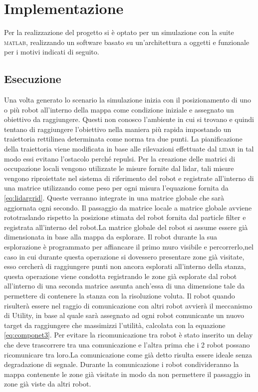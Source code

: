 \section{Implementazione}
\label{sec:implementazione}
Per la realizzazione del progetto si è optato per un simulazione con la suite
\textsc{matlab}, realizzando un software basato su un'architettura a oggetti
e funzionale per i motivi indicati di seguito.
\subsection{Esecuzione}
Una volta generato lo scenario la simulazione inizia con il posizionamento di
uno o più robot all'interno della mappa come condizione iniziale e assegnato un
obiettivo da raggiungere.
Questi non conosco l'ambiente in cui si trovano e quindi tentano di raggiungere
l'obiettivo nella maniera più rapida impostando un traiettoria rettilinea
determinata come norma tra due punti.
La pianificazione della traiettoria viene modificata in base alle rilevazioni
effettuate dal \textsc{lidar} in tal modo essi evitano l'ostacolo perché repulsi.
Per la creazione delle matrici di occupazione locali vengono utilizzate le misure
fornite dal lidar, tali misure vengono riproiettate nel sistema di riferimento del robot
e registrate all'interno di una matrice utilizzando come peso per ogni misura l'equazione
fornita da \eqref{eq:lidargrid}.
Queste verranno integrate in una matrice globale che sarà aggiornata ogni secondo. Il
passaggio da matrice locale a matrice globale avviene rototraslando rispetto la posizione
stimata del robot fornita dal particle filter e registrata all'interno del robot.La matrice
globale del robot si assume essere già dimensionata in base alla mappa da esplorare.
Il robot durante la sua esplorazione è programmato per affiancare il primo muro visibile e
percorrerlo,nel caso in cui durante questa operazione si dovessero presentare zone già visitate,
esso cercherà di raggiungere punti non ancora esplorati all'interno della stanza, questa operazione
viene condotta registrando le zone già esplorate dal robot all'interno di una seconda matrice assunta
anch'essa di una dimensione tale da permettere di contenere la stanza con la risoluzione voluta.
Il robot quando risulterà essere nel raggio di comunicazione con altri robot avvierà il meccanismo di Utility,
in base al quale sarà assegnato ad ogni robot comunicante un nuovo target da raggiungere che massimizzi
l'utilità, calcolata con la equazione \eqref{eq:componet3}. Per evitare la ricomunicazione tra robot è stato
inserito un delay che deve trascorrere tra una comunicazione e l'altra prima che i 2 robot possano ricomunicare
tra loro.La comunicazione come già detto risulta essere ideale senza degradazione di segnale.
Durante la comunicazione i robot condivideranno la mappa contenente le zone già visitate in modo da
non permettere il passaggio in zone già viste da altri robot.
%


